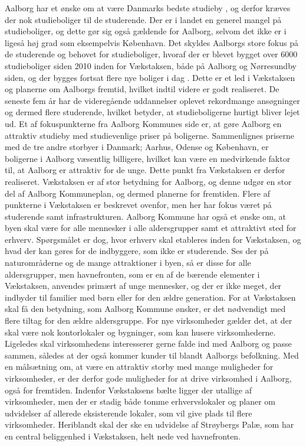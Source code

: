 \newline
\newline
Aalborg har et ønske om at være Danmarks bedste studieby \citep{ungdom}, og derfor kræves der nok studieboliger til de studerende. Der er i landet en generel mangel på studieboliger, og dette gør sig også gældende for Aalborg, selvom det ikke er i ligeså høj grad som eksempelvis København. Det skyldes Aalborgs store fokus på de studerende og behovet for studieboliger, hvoraf der er blevet bygget over 6000 studieboliger siden 2010 inden for Vækstaksen, både på Aalborg og Nørresundby siden, og der bygges fortsat flere nye boliger i dag \citep{studieboliger}. Dette er et led i Vækstaksen og planerne om Aalborgs fremtid, hvilket indtil videre er godt realiseret. De seneste fem år har de videregående uddannelser oplevet rekordmange ansøgninger og dermed flere studerende, hvilket betyder, at studieboligerne hurtigt bliver lejet ud. Et af fokuspunkterne fra Aalborg Kommunes side er, at gøre Aalborg en attraktiv studieby med studievenlige priser på boligerne. Sammenlignes priserne med de tre andre storbyer i Danmark; Aarhus, Odense og København, er boligerne i Aalborg væsentlig billigere, hvilket kan være en medvirkende faktor til, at Aalborg er attraktiv for de unge. Dette punkt fra Vækstaksen er derfor realiseret.
\newline
\newline
Vækstaksen er af stor betydning for Aalborg, og denne udgør en stor del af Aalborg Kommuneplan, og dermed planerne for fremtiden. Flere af punkterne i Vækstaksen er beskrevet ovenfor, men her har fokus været på studerende samt infrastrukturen. Aalborg Kommune har også et ønske om, at byen skal være for alle mennesker i alle aldersgrupper samt et attraktivt sted for erhverv. Spørgsmålet er dog, hvor erhverv skal etableres inden for Vækstaksen, og hvad der kan gøres for de indbyggere, som ikke er studerende. Ses der på naturområderne og de mange attraktioner i byen, så er disse for alle aldersgrupper, men havnefronten, som er en af de bærende elementer i Vækstaksen, anvendes primært af unge mennesker, og der er ikke meget, der indbyder til familier med børn eller for den ældre generation. For at Vækstaksen skal få den betydning, som Aalborg Kommune ønsker, er det nødvendigt med flere tiltag for den ældre aldersgruppe. 
\newline \indent{     }  For nye virksomheder gælder det, at der skal være nok kontorlokaler og bygninger, som kan husere virksomhederne. Ligeledes skal virksomhedens interesserer gerne falde ind med Aalborg og passe sammen, således at der også kommer kunder til blandt Aalborgs befolkning. Med en målsætning om, at være en attraktiv storby med mange muligheder for virksomheder, er der derfor gode muligheder for at drive virksomhed i Aalborg, også for fremtiden. Indenfor Vækstaksens bælte ligger der utallige af virksomheder, men der er stadig både tomme erhvervslokaler og planer om udvidelser af allerede eksisterende lokaler, som vil give plads til flere virksomheder. Heriblandt skal der ske en udvidelse af Strøybergs Palæ, som har en central beliggenhed i Vækstaksen, helt nede ved havnefronten. 
